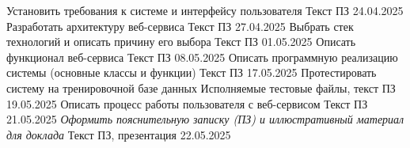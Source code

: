 {  \projecttask{\projectsubtasknum}
  {
    Установить требования к системе и
    интерфейсу пользователя
  }%
  {Текст ПЗ}%
  {24.04.2025}
  {{\signat[xsign=0pt, ysign=-5pt, scale=0.4, ydate=-20pt, date={\small01.01.2001}]}}
  \projecttask{\projectsubtasknum}
  {Разработать архитектуру веб-сервиса}%
  {Текст ПЗ}%
  {27.04.2025}
  {\signat[xsign=-10pt, ysign=4pt, scale=0.25, xdate=17pt, ydate=-2pt, date={\scriptsize01.01.2001}]}
  \projecttask{\projectsubtasknum}
  {
    Выбрать стек технологий и
    описать причину его выбора
  }%
  {Текст ПЗ}%
  {01.05.2025}
  {{\signat[xsign=0pt, ysign=-5pt, scale=0.4, ydate=-20pt, date={\small01.01.2001}]}}
  \projecttask{\projectsubtasknum}
  {Описать функционал веб-сервиса}%
  {Текст ПЗ}%
  {08.05.2025}
  {\signat[xsign=-10pt, ysign=4pt, scale=0.25, xdate=17pt, ydate=-2pt, date={\scriptsize01.01.2001}]}
  \projecttask{\projectsubtasknum}
  {
    Описать программную реализацию системы
    (основные классы и функции)
  }%
  {Текст ПЗ}%
  {17.05.2025}
  {{\signat[xsign=0pt, ysign=-5pt, scale=0.4, ydate=-20pt, date={\small01.01.2001}]}}
  \projecttask{\projectsubtasknum}
  {
    Протестировать систему на тренировочной
    базе данных
  }%
  {Исполняемые тестовые файлы, текст ПЗ}%
  {19.05.2025}
  {\signat[xsign=0pt, ysign=-20pt, scale=0.4, ydate=-40pt, date={01.01.2001}]}
  \projecttask{\projectsubtasknum}
  {Описать процесс работы пользователя с веб-сервисом}%
  {Текст ПЗ}%
  {21.05.2025}
  {{\signat[xsign=0pt, ysign=-5pt, scale=0.4, ydate=-20pt, date={\small01.01.2001}]}}
  \projecttask{\bfseries\projecttasknum}
  {\itshape
    Оформить пояснительную записку (ПЗ) и
    иллюстративный материал для доклада
  }%
  {Текст ПЗ, презентация}%
  {22.05.2025}
  {{\signat[xsign=0pt, ysign=-5pt, scale=0.4, ydate=-20pt, date={\small01.01.2001}]}}
}

\taskliterature{
  \nocite{Sychev}
  \nocite{Sokolov}
  \nocite{Gaidaenko}
}

